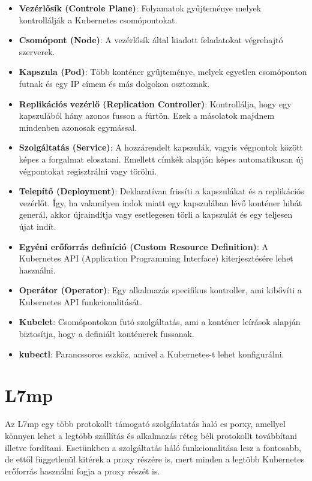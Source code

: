 \begin{itemize}
	\item \textbf{Vezérlősík (Controle Plane)}: Folyamatok gyűjteménye melyek 
	kontrollálják a Kubernetes csomópontokat.
	\item \textbf{Csomópont (Node)}: A vezérlősík által kiadott feladatokat 
	végrehajtó szerverek.
	\item \textbf{Kapszula (Pod)}: Több konténer gyűjteménye, melyek egyetlen
	csomóponton futnak és egy IP címem és más dolgokon osztoznak.
	\item \textbf{Replikációs vezérlő (Replication Controller)}: Kontrollálja,
	hogy egy kapszulából hány azonos fusson a fürtön.  Ezek a másolatok majdnem 
	mindenben azonosak egymással.
	\item \textbf{Szolgáltatás (Service)}: A hozzárendelt kapszulák, vagyis 
	végpontok között képes a forgalmat elosztani. Emellett címkék alapján 
	képes automatikusan új végpontokat regisztrálni vagy törölni.
	\item \textbf{Telepítő (Deployment)}: Deklaratívan frissíti a kapszulákat 
	és a replikációs vezérlőt. Így, ha valamilyen indok miatt egy kapszulában
	lévő konténer hibát generál, akkor újraindítja vagy esetlegesen törli a 
	kapszulát és egy teljesen újat indít. 
	\item \textbf{Egyéni erőforrás definíció (Custom Resource Definition)}:
	A Kubernetes API (Application Programming Interface) kiterjesztésére 
	lehet használni.
	\item \textbf{Operátor (Operator)}: Egy alkalmazás specifikus kontroller, 
	ami kibővíti a Kubernetes API funkcionalitását. 
	\item \textbf{Kubelet}: Csomópontokon futó szolgáltatás, ami a konténer 
	leírások alapján biztosítja, hogy a definiált konténerek fussanak.
	\item \textbf{kubectl}: Parancssoros eszköz, amivel a Kubernetes-t lehet 
	konfigurálni.
\end{itemize}

\section{L7mp}

Az L7mp egy több protokollt támogató szolgálatatás haló es porxy, amellyel 
könnyen lehet a legtöbb szállítás és alkalmazás réteg béli protokollt továbbítani
illetve fordítani. Esetünkben a szolgáltatás háló funkcionalitása lesz a 
fontosabb, de ettől függetlenül kitérek a proxy részére is, mert minden a 
legtöbb Kubernetes erőforrás használni fogja a proxy részét is. 

